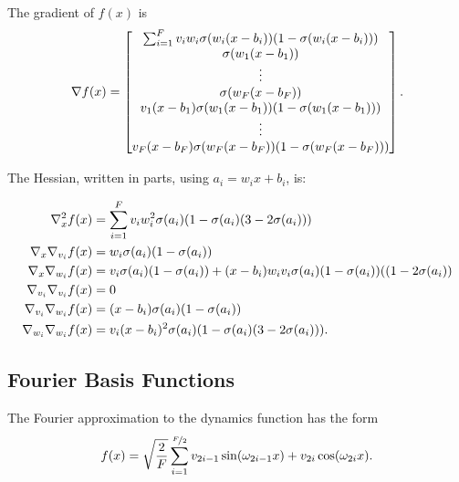 The gradient of $f(x)$ is
\begin{equation}
  \nabla f(x) =
  \begin{bmatrix}
    \sum_{i=1}^F v_i w_i \sigma(w_i(x-b_i))(1-\sigma(w_i(x-b_i))) \\
    \sigma(w_1(x-b_1)) \\
    \vdots \\
    \sigma(w_F(x-b_F)) \\
    v_1 (x-b_1) \sigma(w_1(x-b_1)) (1 - \sigma(w_1(x-b_1))) \\
    \vdots \\
    v_F (x-b_F) \sigma(w_F(x-b_F)) (1 - \sigma(w_F(x-b_F)))
  \end{bmatrix}.
\end{equation}

The Hessian, written in parts, using $a_i = w_i x + b_i$, is:
\begin{fullwidth}\vspace{-\baselineskip}
\begin{subequations}
  \begin{align}
    \nabla^2_x f(x) &= \sum_{i=1}^F v_i w_i^2 \sigma(a_i)(1-\sigma(a_i)(3-2\sigma(a_i))) \\
    \nabla_x \nabla_{v_i} f(x) &= w_i\sigma(a_i)(1-\sigma(a_i)) \\
    \nabla_x \nabla_{w_i} f(x) &= v_i\sigma(a_i)(1-\sigma(a_i))
      + (x-b_i)w_i v_i \sigma(a_i)(1-\sigma(a_i))((1-2\sigma(a_i))\\
    \nabla_{v_i} \nabla_{v_i} f(x) &= 0 \\
    \nabla_{v_i} \nabla_{w_i} f(x) &= (x-b_i)\sigma(a_i)(1-\sigma(a_i)) \\
    \nabla_{w_i} \nabla_{w_i} f(x) &=
      v_i(x-b_i)^2\sigma(a_i)(1-\sigma(a_i)(3-2\sigma(a_i))).
  \end{align}
\end{subequations}
\end{fullwidth}

\subsection{Fourier Basis Functions}

The Fourier approximation to the dynamics function has the form
\begin{equation}
  f(x) = \sqrt{\frac{2}{F}}\sum_{i=1}^{\nicefrac{F}{2}} v_{2i-1}
    \sin(\omega_{2i-1} x) + v_{2i} \cos(\omega_{2i} x).
\end{equation}

